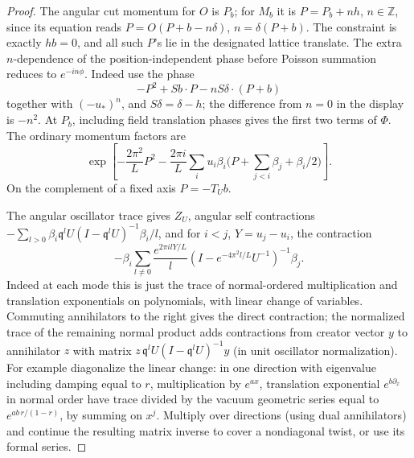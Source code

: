 \documentclass[11pt]{article}
\numberwithin{equation}{section}
\theoremstyle{definition}\newtheorem{definition}[theorem]{Definition}
\theoremstyle{remark}\newtheorem{remark}[theorem]{Remark}
\begin{document}
\begin{proof}
The angular cut momentum for \(O\) is \(P_b\); for \(M_b\) it is \(P=P_b+n h\), \(n\in\mathbb Z\), since its equation reads \(P=O(P+b-n\delta)\), \(n=\delta(P+b)\). The constraint is exactly \(hb=0\), and all such \(P\)'s lie in the designated lattice translate. The extra \(n\)-dependence of the position-independent phase before Poisson summation reduces to \(e^{-i n\phi}\). Indeed use the phase
\[
 -P^2+Sb\cdot P-n S\delta\cdot(P+b)
\]
together with \((-u_*)^n\), and \(S\delta=\delta-h\); the difference from \(n=0\) in the display is \(-n^2\). At \(P_b\), including field translation phases gives the first two terms of \(\Phi\). The ordinary momentum factors are
\[
 \exp\left[-\frac{2\pi^2}L P^2-\frac{2\pi i}{L}
       \sum_i u_i\beta_i\Big(P+\sum_{j<i}\beta_j+\beta_i/2\Big)\right].
\]
On the complement of a fixed axis \(P=-T_U b\).

The angular oscillator trace gives \(Z_U\), angular self contractions
\(-\sum_{l>0}\beta_i \mathfrak q^l U(I-\mathfrak q^l U)^{-1}\beta_i/l\), and for \(i<j\), \(Y=u_j-u_i\), the contraction
\[
 -\beta_i\sum_{l\ne0}\frac{e^{2\pi i lY/L}}l
       (I-e^{-4\pi^2 l/L} U^{-1})^{-1}\beta_j.
\]
Indeed at each mode this is just the trace of normal-ordered multiplication and translation exponentials on polynomials, with linear change of variables. Commuting annihilators to the right gives the direct contraction; the normalized trace of the remaining normal product adds contractions from creator vector \(y\) to annihilator \(z\) with matrix \(z\,\mathfrak q^l U(I-\mathfrak q^l U)^{-1} y\) (in unit oscillator normalization). For example diagonalize the linear change: in one direction with eigenvalue including damping equal to \(r\), multiplication by \(e^{a x}\), translation exponential \(e^{b\partial_x}\) in normal order have trace divided by the vacuum geometric series equal to \(e^{ab\,r/(1-r)}\), by summing on \(x^j\). Multiply over directions (using dual annihilators) and continue the resulting matrix inverse to cover a nondiagonal twist, or use its formal series.


\end{proof}
\end{document}
